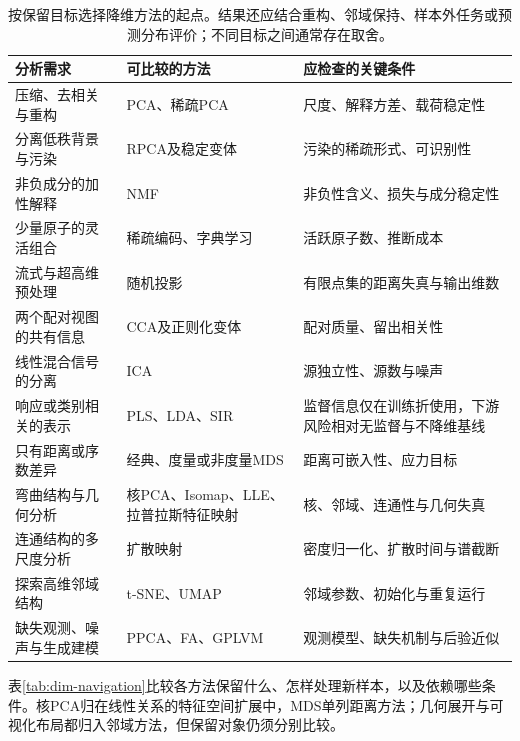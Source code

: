 \begin{table}[!ht]
  \centering
  \small
  \begin{tabularx}{\linewidth}{@{}>{\RaggedRight\arraybackslash}X>{\RaggedRight\arraybackslash}X>{\RaggedRight\arraybackslash}X@{}}
    \toprule
    分析需求 & 可比较的方法 & 应检查的关键条件\\
    \midrule
    压缩、去相关与重构 & PCA、稀疏PCA & 尺度、解释方差、载荷稳定性\\
    分离低秩背景与污染 & RPCA及稳定变体 & 污染的稀疏形式、可识别性\\
    非负成分的加性解释 & NMF & 非负性含义、损失与成分稳定性\\
    少量原子的灵活组合 & 稀疏编码、字典学习 & 活跃原子数、推断成本\\
    流式与超高维预处理 & 随机投影 & 有限点集的距离失真与输出维数\\
    两个配对视图的共有信息 & CCA及正则化变体 & 配对质量、留出相关性\\
    线性混合信号的分离 & ICA & 源独立性、源数与噪声\\
    响应或类别相关的表示 & PLS、LDA、SIR & 监督信息仅在训练折使用，下游风险相对无监督与不降维基线\\
    只有距离或序数差异 & 经典、度量或非度量MDS & 距离可嵌入性、应力目标\\
    弯曲结构与几何分析 & 核PCA、Isomap、LLE、拉普拉斯特征映射 & 核、邻域、连通性与几何失真\\
    连通结构的多尺度分析 & 扩散映射 & 密度归一化、扩散时间与谱截断\\
    探索高维邻域结构 & t-SNE、UMAP & 邻域参数、初始化与重复运行\\
    缺失观测、噪声与生成建模 & PPCA、FA、GPLVM & 观测模型、缺失机制与后验近似\\
    \bottomrule
  \end{tabularx}
  \caption{按保留目标选择降维方法的起点。结果还应结合重构、邻域保持、样本外任务或预测分布评价；不同目标之间通常存在取舍。}
  \label{tab:dim-selection}
\end{table}

表\ref{tab:dim-navigation}比较各方法保留什么、怎样处理新样本，以及依赖哪些条件。核PCA归在线性关系的特征空间扩展中，MDS单列距离方法；几何展开与可视化布局都归入邻域方法，但保留对象仍须分别比较。

